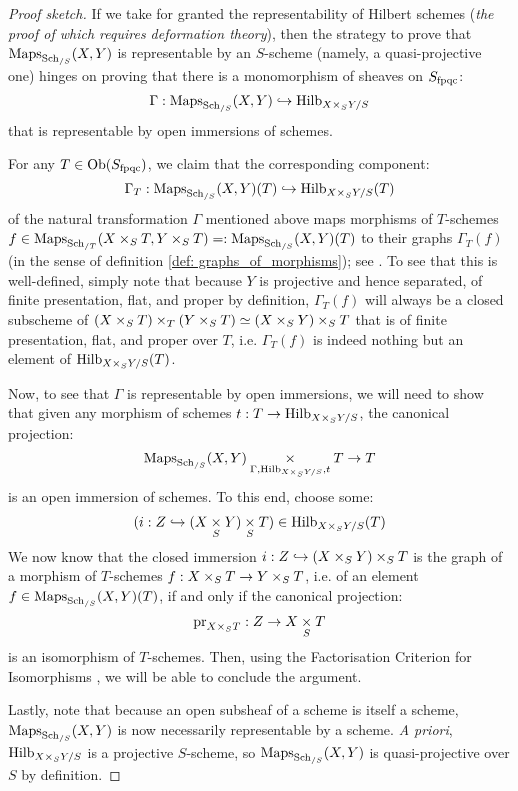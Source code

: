             \begin{proof}[Proof sketch]
                If we take for granted the representability of Hilbert schemes (\textit{the proof of which requires deformation theory}), then the strategy to prove that $\mathrm{Maps}_{\mathrm{Sch}_{/S}}(X, Y)$ is representable by an $S$-scheme (namely, a quasi-projective one) hinges on proving that there is a monomorphism of sheaves on $S_{\mathrm{fpqc}}$:
                    $$\Gamma: \Maps_{\Sch_{/S}}(X, Y) \hookrightarrow \Hilb_{X \x_S Y/S}$$
                that is representable by open immersions of schemes.

                For any $T \in \mathrm{Ob}(S_{\mathrm{fpqc}})$, we claim that the corresponding component:
                    $$\Gamma_T: \Maps_{\Sch_{/S}}(X, Y)(T) \hookrightarrow \Hilb_{X \x_S Y/S}(T)$$
                of the natural transformation $\Gamma$ mentioned above maps morphisms of $T$-schemes $f \in \Maps_{\Sch_{/T}}(X \x_S T, Y \x_S T) =: \Maps_{\Sch_{/S}}(X, Y)(T)$ to their graphs $\Gamma_T(f)$ (in the sense of definition \ref{def: graphs_of_morphisms}); see \cite[\href{https://stacks.math.columbia.edu/tag/0D1A}{Tag 0D1A}]{stacks-project}. To see that this is well-defined, simply note that because $Y$ is projective and hence separated, of finite presentation, flat, and proper by definition, $\Gamma_T(f)$ will always be a closed subscheme of $(X \x_S T) \x_T (Y \x_S T) \cong (X \x_S Y) \x_S T$ that is of finite presentation, flat, and proper over $T$, i.e. $\Gamma_T(f)$ is indeed nothing but an element of $\Hilb_{X \x_S Y/S}(T)$.

                Now, to see that $\Gamma$ is representable by open immersions, we will need to show that given any morphism of schemes $t: T \to \Hilb_{X \x_S Y/S}$, the canonical projection:
                    $$\Maps_{\Sch_{/S}}(X, Y) \x_{ \Gamma, \Hilb_{X \x_S Y/S}, t } T \to T$$
                is an open immersion of schemes. To this end, choose some:
                    $$(i: Z \hookrightarrow (X \x_S Y) \x_S T) \in \Hilb_{X \x_S Y/S}(T)$$
                We now know that the closed immersion $i: Z \hookrightarrow (X \x_S Y) \x_S T$ is the graph of a morphism of $T$-schemes $f: X \x_S T \to Y \x_S T$, i.e. of an element $f \in \mathrm{Maps}_{\mathrm{Sch}_{/S}}(X, Y)(T)$, if and only if the canonical projection:
                    $$\pr_{X \x_S T}: Z \to X \x_S T$$
                is an isomorphism of $T$-schemes. Then, using the Factorisation Criterion for Isomorphisms \cite[\href{https://stacks.math.columbia.edu/tag/05XD}{Tag 05XD}]{stacks-project}, we will be able to conclude the argument.  

                Lastly, note that because an open subsheaf of a scheme is itself a scheme, $\mathrm{Maps}_{\mathrm{Sch}_{/S}}(X, Y)$ is now necessarily representable by a scheme. \textit{A priori}, $\Hilb_{X \x_S Y/S}$ is a projective $S$-scheme, so $\mathrm{Maps}_{\mathrm{Sch}_{/S}}(X, Y)$ is quasi-projective over $S$ by definition.
            \end{proof}
